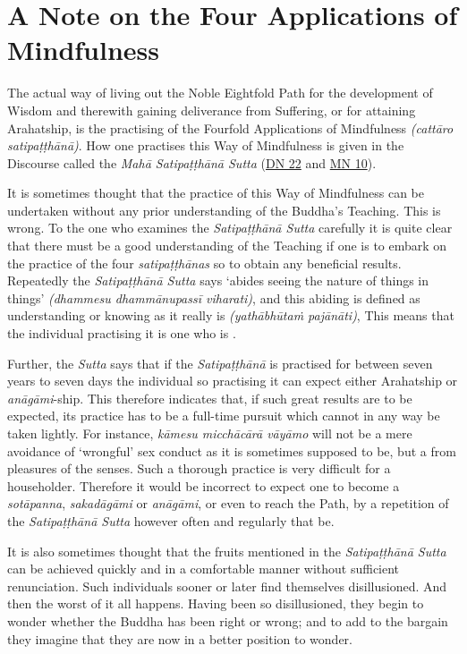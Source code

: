 \chapter{A Note on the Four Applications of Mindfulness}

\protect\hypertarget{start}{}{}The actual way of living out the Noble Eightfold Path for the development of Wisdom and therewith gaining deliverance from Suffering, or for attaining Arahatship, is the practising of the Fourfold Applications of Mindfulness \emph{(cattāro satipaṭṭhānā)}. How one practises this Way of Mindfulness is given in the Discourse called the \emph{Mahā Satipaṭṭhānā Sutta} (\href{https://suttacentral.net/dn22/en/sujato}{DN 22} and \href{https://suttacentral.net/mn10/en/sujato}{MN 10}).

It is sometimes thought that the practice of this Way of Mindfulness can be undertaken without any prior understanding of the Buddha's Teaching. This is wrong. To the one who examines the \emph{Satipaṭṭhānā Sutta} carefully it is quite clear that there must be a good understanding of the Teaching if one is to embark on the practice of the four \emph{satipaṭṭhānas} so to obtain any beneficial results. Repeatedly the \emph{Satipaṭṭhānā Sutta} says `abides seeing the nature of things in things' \emph{(dhammesu dhammānupassī viharati)}, and this abiding is defined as understanding or knowing as it really is \emph{(yathābhūtaṁ pajānāti)}, This means that the individual practising it is one who is .

Further, the \emph{Sutta} says that if the \emph{Satipaṭṭhānā} is practised for between seven years to seven days the individual so practising it can expect either Arahatship or \emph{anāgāmi}-ship. This therefore indicates that, if such great results are to be expected, its practice has to be a full-time pursuit which cannot in any way be taken lightly. For instance, \emph{kāmesu micchācārā vāyāmo} will not be a mere avoidance of `wrongful' sex conduct as it is sometimes supposed to be, but a  from  pleasures of the senses. Such a thorough practice is very difficult for a householder. Therefore it would be incorrect to expect one to become a \emph{sotāpanna}, \emph{sakadāgāmi} or \emph{anāgāmi}, or even to reach the Path, by a repetition of the \emph{Satipaṭṭhānā Sutta} however often and regularly that be.

It is also sometimes thought that the fruits mentioned in the \emph{Satipaṭṭhānā Sutta} can be achieved quickly and in a comfortable manner without sufficient renunciation. Such individuals sooner or later find themselves disillusioned. And then the worst of it all happens. Having been so disillusioned, they begin to wonder whether the Buddha has been right or wrong; and to add to the bargain they imagine that they are now in a better position to wonder.

